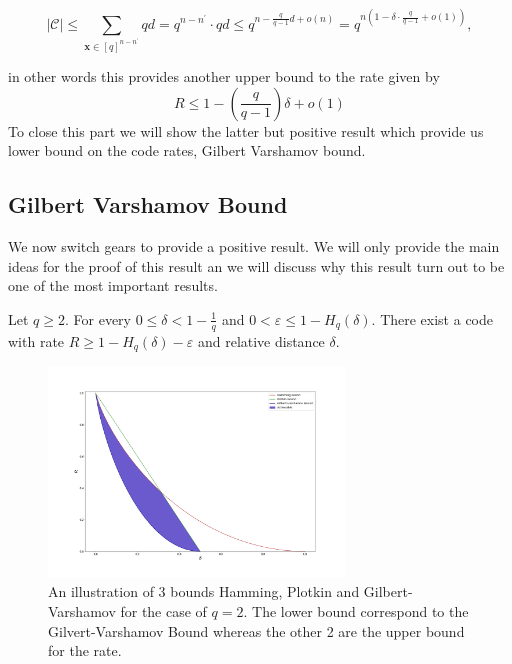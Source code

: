 \begin{equation}
\left.|\mathcal{C}| \leq \sum_{\mathbf{x} \in[q]^{n-n^{\prime}}} q d=q^{n-n^{\prime}} \cdot q d \leq q^{n-\frac{q}{q-1} d+o(n)}=q^{n\left(1-\delta \cdot \frac{q}{q-1}+o(1)\right)}\right.,
\end{equation}

in other words this provides another upper bound to the rate given by
\begin{equation}
R \leq 1-\left(\frac{q}{q-1}\right) \delta+o(1)
\label{CH2:Plotkin:bound_rate}
\end{equation}
To close this part we will show the latter but positive result which provide us  lower bound on the code rates, Gilbert Varshamov bound.
\subsection{Gilbert Varshamov Bound}
We now switch gears to provide a positive result. We will only provide the main ideas for the proof of this result an we will discuss why this result turn out to be one of the most important results.
\begin{definition}
Let $q\geq 2$. For every $0 \leq \delta<1-\frac{1}{q}$ and $0<\varepsilon \leq 1-H_{q}(\delta)$. There exist a code with rate $R \geq 1-H_{q}(\delta)-\varepsilon$ and relative distance $\delta$.
\label{CH2:Definition_Gilbert_Varshamov}
\end{definition}

\begin{figure}
\centering
\includegraphics[width=0.7\textwidth]{Figures/Hamming_plotkin_Gilbert_bound.png}
\caption{An illustration of 3 bounds Hamming, Plotkin and Gilbert-Varshamov for the case of $q=2$. The lower bound correspond to the Gilvert-Varshamov Bound whereas the other 2 are the upper bound for the rate.}
\end{figure}

